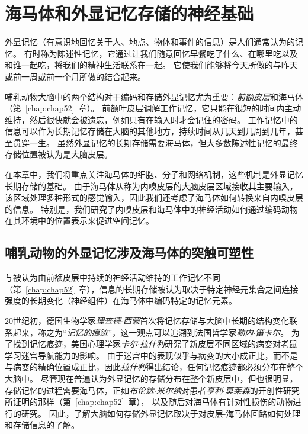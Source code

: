 \chapter{海马体和外显记忆存储的神经基础} \label{chap:chap54}

外显记忆（有意识地回忆关于人、地点、物体和事件的信息）是人们通常认为的记忆。
有时称为陈述性记忆，它通过让我们随意回忆早餐吃了什么、在哪里吃以及和谁一起吃，将我们的精神生活联系在一起。
它使我们能够将今天所做的与昨天或前一周或前一个月所做的结合起来。


哺乳动物大脑中的两个结构对于编码和存储外显记忆尤为重要：\textit{前额皮层}和海马体（第~\ref{chap:chap52}~章）。
前额叶皮层调解工作记忆，它只能在很短的时间内主动维持，然后很快就会被遗忘，例如只有在输入时才会记住的密码。
工作记忆中的信息可以作为长期记忆存储在大脑的其他地方，持续时间从几天到几周到几年，甚至贯穿一生。
虽然外显记忆的长期存储需要海马体，但大多数陈述性记忆的最终存储位置被认为是大脑皮层。


在本章中，我们将重点关注海马体的细胞、分子和网络机制，这些机制是外显记忆长期存储的基础。
由于海马体从称为内嗅皮层的大脑皮层区域接收其主要输入，该区域处理多种形式的感觉输入，因此我们还考虑了海马体如何转换来自内嗅皮层的信息。
特别是，我们研究了内嗅皮层和海马体中的神经活动如何通过编码动物在其环境中的位置表示来促进空间记忆。



\section{哺乳动物的外显记忆涉及海马体的突触可塑性}

与被认为由前额皮层中持续的神经活动维持的工作记忆不同（第~\ref{chap:chap52}~章），信息的长期存储被认为取决于特定神经元集合之间连接强度的长期变化（神经组件）在海马体中编码特定的记忆元素。


20世纪初，德国生物学家\textit{理查德$\cdot$西蒙}首次将记忆存储与大脑中长期的结构变化联系起来，称之为“\textit{记忆的痕迹}”，这一观点可以追溯到法国哲学家\textit{勒内$\cdot$笛卡尔}。
为了找到记忆痕迹，美国心理学家\textit{卡尔$\cdot$拉什利}研究了新皮层不同区域的病变对老鼠学习迷宫导航能力的影响。
由于迷宫中的表现似乎与病变的大小成正比，而不是与病变的精确位置成正比，因此\textit{拉什利}得出结论，任何记忆痕迹都必须分布在整个大脑中。
尽管现在普遍认为外显记忆的存储分布在整个新皮层中，但也很明显，存储记忆的过程需要海马体，正如\textit{布伦达$\cdot$米尔纳}对患者\textit{亨利$\cdot$莫莱森}的开创性研究所证明的那样（第~\ref{chap:chap52}~章），
以及随后对海马体有针对性损伤的动物进行的研究。
因此，了解大脑如何存储外显记忆取决于对皮层-海马体回路如何处理和存储信息的了解。


